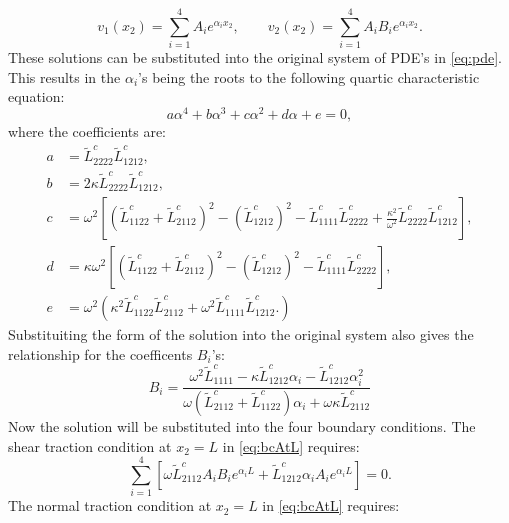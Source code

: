 \documentclass[11pt]{report}
\begin{document}
\begin{appendices}
\begin{equation} \label{eq:exp_u1_v}
v_1(x_2) = \sum_{i = 1}^{4}A_ie^{\alpha_i x_2}, \qquad v_2(x_2) = \sum_{i = 1}^{4} A_i B_i e^{\alpha_i x_2}.
\end{equation}
These solutions can be substituted into the original system of PDE's in \eqref{eq:pde}. This results in the $\alpha_i$'s being the roots to the following quartic characteristic equation:
\begin{equation} \label{eq:characteristic}
a\alpha^4 + b\alpha^3 + c\alpha^2 + d\alpha + e = 0,
\end{equation}
where the coefficients are:
\begin{equation*}
\begin{aligned}
  a &= \tilde{L}^{c}_{2222}\tilde{L}^{c}_{1212}, \\
  b &= 2\kappa \tilde{L}^{c}_{2222}\tilde{L}^{c}_{1212}, \\
  c &= \omega^2 \left[ \left ( \tilde{L}^{c}_{1122} + \tilde{L}^{c}_{2112}\right )^2 - \left ( \tilde{L}^{c}_{1212} \right )^2 - \tilde{L}^{c}_{1111}\tilde{L}^{c}_{2222} + \frac{\kappa^2}{\omega^2}\tilde{L}^{c}_{2222}\tilde{L}^{c}_{1212}    \right ], \\
  d &= \kappa \omega^2 \left[ \left ( \tilde{L}^{c}_{1122} + \tilde{L}^{c}_{2112}\right )^2 - \left ( \tilde{L}^{c}_{1212} \right )^2 - \tilde{L}^{c}_{1111}\tilde{L}^{c}_{2222} \right ], \\
  e &= \omega^2 \left( \kappa^2 \tilde{L}^{c}_{1122}\tilde{L}^{c}_{2112} + \omega^2 \tilde{L}^{c}_{1111}\tilde{L}^{c}_{1212}. \right)
\end{aligned}
\end{equation*}
Substituiting the form of the solution into the original system also gives the relationship for the coefficents $B_i$'s:
\begin{equation}
B_i = \frac {\omega^2 \tilde{L}^{c}_{1111} - \kappa \tilde{L}^{c}_{1212} \alpha_i - \tilde{L}^{c}_{1212} \alpha_i^2 }
            {\omega \left (\tilde{L}^{c}_{2112} + \tilde{L}^{c}_{1122} \right) \alpha_i + \omega \kappa \tilde{L}^{c}_{2112}}
\end{equation}
Now the solution will be substituted into the four boundary conditions. The shear traction condition at $x_2 = L$ in \eqref{eq:bcAtL}  requires:
\begin{equation}
\sum_{i = 1}^4 \left[ \omega \tilde{L}^{c}_{2112} A_iB_i e^{\alpha_iL} + \tilde{L}^{c}_{1212} \alpha_i A_i e^{\alpha_i L} \right ] = 0.
\end{equation}
The normal traction condition at $x_2 = L$ in \eqref{eq:bcAtL}  requires:

\end{appendices}
\end{document}

